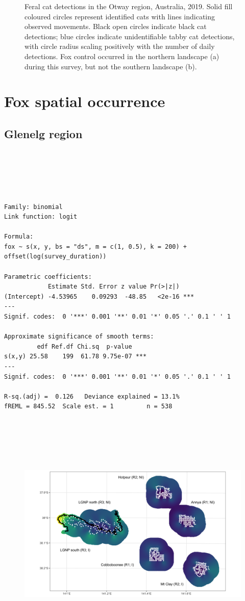 \documentclass[11pt,a4paper,titlepage,twoside,openright]{style/unimelbthesis}
\begin{document}
\begin{mainmatter}
\begin{figure}
{}

\caption{Feral cat detections in the Otway region, Australia, 2019. Solid fill coloured circles represent identified cats with lines indicating observed movements. Black open circles indicate black cat detections; blue circles indicate unidentifiable tabby cat detections, with circle radius scaling positively with the number of daily detections. Fox control occurred in the northern landscape (a) during this survey, but not the southern landscape (b).}\label{fig:density-plot-ch-6}
\end{figure}
\newpage

\hypertarget{density-app-fox}{%
\section{Fox spatial occurrence}\label{density-app-fox}}

\hypertarget{glenelg-region-4}{%
\subsection{Glenelg region}\label{glenelg-region-4}}

\(~\)

\(~\)

\(~\)
\begin{verbatim}
Family: binomial 
Link function: logit 

Formula:
fox ~ s(x, y, bs = "ds", m = c(1, 0.5), k = 200) + offset(log(survey_duration))

Parametric coefficients:
            Estimate Std. Error z value Pr(>|z|)    
(Intercept) -4.53965    0.09293  -48.85   <2e-16 ***
---
Signif. codes:  0 '***' 0.001 '**' 0.01 '*' 0.05 '.' 0.1 ' ' 1

Approximate significance of smooth terms:
         edf Ref.df Chi.sq  p-value    
s(x,y) 25.58    199  61.78 9.75e-07 ***
---
Signif. codes:  0 '***' 0.001 '**' 0.01 '*' 0.05 '.' 0.1 ' ' 1

R-sq.(adj) =  0.126   Deviance explained = 13.1%
fREML = 845.52  Scale est. = 1         n = 538
\end{verbatim}
\newpage

\(~\)

\(~\)

\(~\)
\begin{figure}

{\centering \includegraphics[width=1\linewidth]{figure/fox_occ_se_glenelg_600dpi} 

}
\end{figure}
\end{mainmatter}
\end{document}
